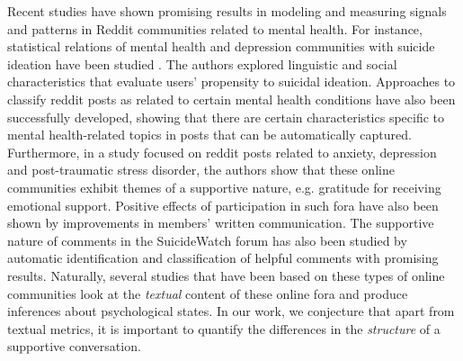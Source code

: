 Recent studies have shown promising results in modeling and measuring signals and patterns in Reddit communities related to mental health. For instance, statistical relations of mental health and depression communities with suicide ideation have been studied \cite{DeChoudhury2014,DeChoudhury2016}. The authors explored linguistic and social characteristics that evaluate users' propensity to suicidal ideation. Approaches to classify reddit posts as related to certain mental health conditions have also been successfully developed, showing that there are certain characteristics specific to mental health-related topics in posts that can be automatically captured\cite{gkotsis2017characterisation}. Furthermore, in a study focused on reddit posts related to anxiety, depression and post-traumatic stress disorder, the authors show that these online communities exhibit themes of a supportive nature, e.g. gratitude for receiving emotional support\cite{park2018examining}. Positive effects of  participation in such fora have also been shown by improvements in members' written communication\cite{info:doi/10.2196/jmir.8219}. The supportive nature of comments in the SuicideWatch forum has also been studied by automatic identification and classification of helpful comments with promising results\cite{Kavuluru:2016:CHC:2975167.2975170}.
Naturally, several studies that have been based on these types of online communities 
look at the \emph{textual} content of these online fora and produce inferences about psychological states. In our work, we conjecture that apart from textual metrics, it is important to quantify the differences in the \emph{structure} of a supportive conversation.




